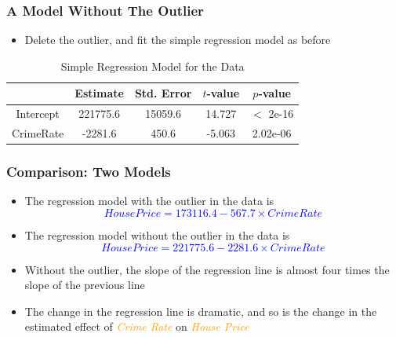 \documentclass[10pt]{beamer}
\theoremstyle{plain}
\begin{document}
\begin{frame}
\frametitle{\sc A Model Without The Outlier}
	\begin{itemize}
		\item Delete the outlier, and fit the simple regression model as before
	\end{itemize}
    \begin{table}[hptb]
	\scriptsize
	\caption{\small Simple Regression Model for the Data}
	\begin{center}
		\begin{tabular}{ c c c c c} 
			\toprule
			& Estimate & Std. Error & $t$-value & $p$-value \\
			\midrule
			Intercept & 221775.6  & 15059.6  & 14.727 & $<$ 2e-16 \\
            CrimeRate & -2281.6   &   450.6  & -5.063 & 2.02e-06 \\
			\bottomrule
		\end{tabular}
		\end{center}
\end{table}
\end{frame}


\begin{frame}
\frametitle{\sc Comparison: Two Models}
	\begin{itemize}
		\item The regression model with the outlier in the data is
		\textcolor{blue}{\[
		House Price = 173116.4 - 567.7 \times Crime Rate
		\]}
		\item The regression model without the outlier in the data is
		\textcolor{blue}{\[
		House Price = 221775.6 - 2281.6 \times Crime Rate
		\]}
		\item Without the outlier, the slope of the regression line is almost four times the slope of the previous line
		\item The change in the regression line is dramatic, and so is the change in the estimated effect of \textcolor{orange}{\textit{Crime Rate}} on \textcolor{orange}{\textit{House Price}}
	\end{itemize}
\end{frame}
\end{document}
